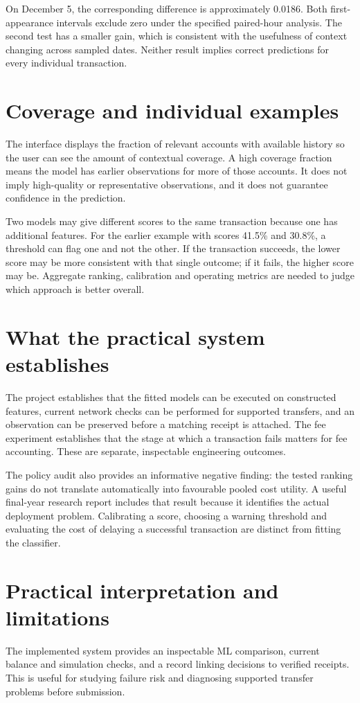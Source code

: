 \documentclass[12pt,a4paper,oneside]{report}
\begin{document}
On December 5, the corresponding difference is approximately 0.0186. Both first-appearance intervals exclude zero under the specified paired-hour analysis. The second test has a smaller gain, which is consistent with the usefulness of context changing across sampled dates. Neither result implies correct predictions for every individual transaction.
\section{Coverage and individual examples}
The interface displays the fraction of relevant accounts with available history so the user can see the amount of contextual coverage. A high coverage fraction means the model has earlier observations for more of those accounts. It does not imply high-quality or representative observations, and it does not guarantee confidence in the prediction.

Two models may give different scores to the same transaction because one has additional features. For the earlier example with scores 41.5\% and 30.8\%, a threshold can flag one and not the other. If the transaction succeeds, the lower score may be more consistent with that single outcome; if it fails, the higher score may be. Aggregate ranking, calibration and operating metrics are needed to judge which approach is better overall.
\section{What the practical system establishes}
The project establishes that the fitted models can be executed on constructed features, current network checks can be performed for supported transfers, and an observation can be preserved before a matching receipt is attached. The fee experiment establishes that the stage at which a transaction fails matters for fee accounting. These are separate, inspectable engineering outcomes.

The policy audit also provides an informative negative finding: the tested ranking gains do not translate automatically into favourable pooled cost utility. A useful final-year research report includes that result because it identifies the actual deployment problem. Calibrating a score, choosing a warning threshold and evaluating the cost of delaying a successful transaction are distinct from fitting the classifier.

\section{Practical interpretation and limitations}
The implemented system provides an inspectable ML comparison, current balance and simulation checks, and a record linking decisions to verified receipts. This is useful for studying failure risk and diagnosing supported transfer problems before submission.
\end{document}
